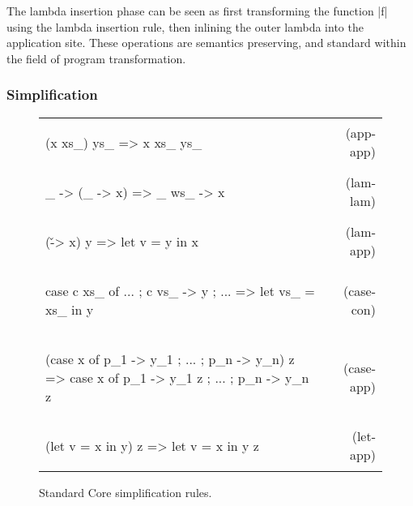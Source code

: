 \documentclass[preprint]{sigplanconf}
\begin{document}
The lambda insertion phase can be seen as first transforming the function |f| using the lambda insertion rule, then inlining the outer lambda into the application site. These operations are semantics preserving, and standard within the field of program transformation.

\subsubsection{Simplification}

\newcommand{\simp}[2]{\vspace{-7mm} #2 & (#1) \\}
\newenvironment{simplify}
    {\begin{flushright}
     \begin{tabular}{p{6.5cm}r}
    }
    {\end{tabular}
     \vspace{-7mm}
     \end{flushright}
    }

\begin{figure}
\begin{simplify}

\simp{app-app}{
\begin{code}
(x xs_) ys_
    => x xs_ ys_
\end{code}}

\simp{lam-lam}{
\begin{code}
\vs_ -> (\ws_ -> x)
    => \vs_ ws_ -> x
\end{code}}

\simp{lam-app}{
\begin{code}
(\v -> x) y
    => let v = y in x
\end{code}}

\simp{case-con}{
\begin{code}
case c xs_ of {... ; c vs_ -> y ; ...}
    => let vs_ = xs_ in y
\end{code}}

\simp{case-app}{
\begin{code}
(case x of {p_1 -> y_1 ; ... ; p_n -> y_n}) z
    => case x of {p_1 -> y_1 z ; ... ; p_n -> y_n z}
\end{code}}

\simp{let-app}{
\begin{code}
(let v = x in y) z
    => let v = x in y z
\end{code}}

\end{simplify}
\caption{Standard Core simplification rules.}
\label{fig:simplify}
\end{figure}
\end{document}
